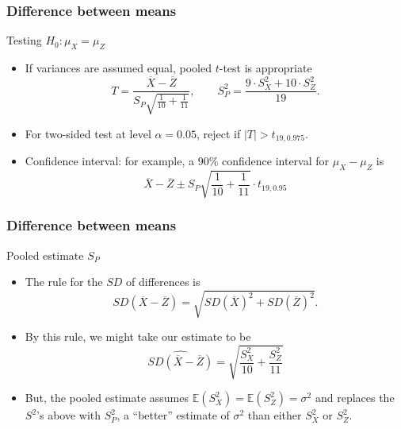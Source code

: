 \documentclass[handout]{beamer}
\newcommand{\Ee}{\mathbb{E}}
\begin{document}

   \begin{frame} \frametitle{Difference between means}

   \begin{block}
   {Testing $H_0:\mu_X=\mu_Z$}
   \begin{itemize}
   \item If variances are assumed equal, pooled $t$-test is appropriate
   $$
   T = \frac{\overline{X} - \overline{Z}}{S_P \sqrt{\frac{1}{10}
   + \frac{1}{11}}}, \qquad S^2_P = \frac{9 \cdot S^2_X + 10 \cdot S^2_Z}{19}.$$
   \item For two-sided test at level $\alpha=0.05$, reject if $|T| > t_{19, 0.975}$.
   \item Confidence interval: for example, a $90\%$ confidence interval
   for $\mu_X-\mu_Z$ is
   $$
   \overline{X}-\overline{Z} \pm S_P \sqrt{\frac{1}{10}
   + \frac{1}{11}} \cdot  t_{19,0.95}
   $$
   \end{itemize}
   \end{block}
   \end{frame}


   \begin{frame} \frametitle{Difference between means}

   \begin{block}
   {Pooled estimate $S_P$}
   \begin{itemize}
   \item The rule for the $SD$ of differences is
   $$
   SD(\overline{X}-\overline{Z}) = \sqrt{SD(\overline{X})^2+SD(\overline{Z})^2}.
   $$
   \item By this rule, we might take our estimate to be
   $$
   \widehat{SD(\overline{X}-\overline{Z})} = \sqrt{\frac{S^2_X}{10} + \frac{S^2_Z}{11}}
   $$
   \item But, the pooled estimate assumes $\Ee(S^2_X)=\Ee(S^2_Z)=\sigma^2$ and replaces
   the $S^2$'s above with $S^2_P$, a ``better'' estimate of
   $\sigma^2$ than either $S^2_X$ or $S^2_Z$.
   \end{itemize}
   \end{block}
   \end{frame}

\end{document}
